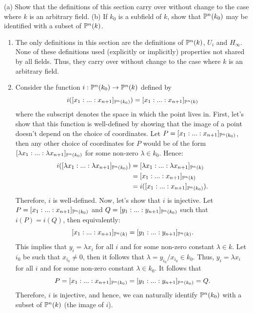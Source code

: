 \begin{exercise}
    (a) Show that the definitions of this section carry over without change to the case where $k$ is an arbitrary field. (b) If $k_0$ is a subfield of $k$, show that $\P^n(k_0)$ may be identified with a subset of $\P^n(k)$. \\
\end{exercise}

\begin{solution}
    \begin{enumerate}
        \item The only definitions in this section are the definitions of $\P^n(k)$, $U_i$ and $H_{\infty}$. None of these definitions used (explicitly or implicitly) properties not shared by all fields. Thus, they carry over without change to the case where $k$ is an arbitrary field.
        \item Consider the function $i : \P^n(k_0) \to \P^n(k)$ defined by
        $$i([x_1: ... : x_{n+1}]_{\P^n(k_0)}) = [x_1: ... : x_{n+1}]_{\P^n(k)}$$
        where the subscript denotes the space in which the point lives in. First, let's show that this function is well-defined by showing that the image of a point doesn't depend on the choice of coordinates. Let $P  = [x_1 : ... : x_{n+1}]_{\P^n(k_0)}$, then any other choice of coordinates for $P$ would be of the form $[\lambda x_1 : ... : \lambda x_{n+1}]_{\P^n(k_0)}$ for some non-zero $\lambda \in k_0$. Hence:
        \begin{align*}
            i([\lambda x_1 : ... : \lambda x_{n+1}]_{\P^n(k_0)}) &= [\lambda x_1 : ... : \lambda x_{n+1}]_{\P^n(k)} \\
            &= [x_1 : ... : x_{n+1}]_{\P^n(k)} \\
            &= i([x_1 : ... : x_{n+1}]_{\P^n(k_0)}).
        \end{align*}
        Therefore, $i$ is well-defined. Now, let's show that $i$ is injective. Let $P = [x_1 : ... : x_{n+1}]_{\P^n(k_0)}$ and $Q = [y_1 : ... : y_{n+1}]_{\P^n(k_0)}$ such that $i(P) = i(Q)$, then equivalently:
        $$[x_1 : ... : x_{n+1}]_{\P^n(k)} = [y_1 : ... : y_{n+1}]_{\P^n(k)}.$$
        This implies that $y_i = \lambda x_i$ for all $i$ and for some non-zero constant $\lambda \in k$. Let $i_0$ be such that $x_{i_0} \neq 0$, then it follows that $\lambda = y_{i_0}/x_{i_0} \in k_0$. Thus, $y_i = \lambda x_i$ for all $i$ and for some non-zero constant $\lambda \in k_0$. It follows that
        $$P = [x_1 : ... : x_{n+1}]_{\P^n(k_0)} = [y_1 : ... : y_{n+1}]_{\P^n(k_0)} = Q.$$
        Therefore, $i$ is injective, and hence, we can naturally identify $\P^n(k_0)$ with a subset of $\P^n(k)$ (the image of $i$).
    \end{enumerate}
\end{solution}